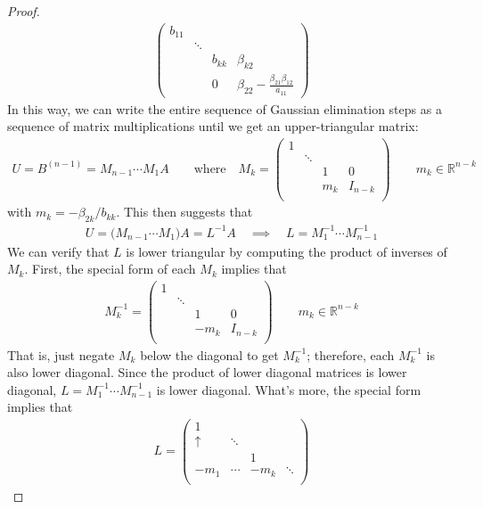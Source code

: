 \documentclass[12pt]{article}
\numberwithin{equation}{section} %
\theoremstyle{plain}
\theoremstyle{definition}
\theoremstyle{remark}
\newcommand{\R}{\mathbb{R}}
\begin{document}
\begin{proof}
\begin{align*}
\begin{pmatrix}
    b_{11} & \\
    & \ddots &  & \\
    & & b_{kk} & \beta_{k2}  \\
    & & 0 & \beta_{22}
      - \frac{\beta_{21}\beta_{12}}{a_{11}}
  \end{pmatrix}
\end{align*}
In this way, we can write the entire sequence of Gaussian elimination
steps as a sequence of matrix multiplications until we get an
upper-triangular matrix:
\begin{align*}
  U = B^{(n-1)} = M_{n-1}\cdots M_1 A
  \qquad
  \text{where}\quad
  M_k
  =
  \begin{pmatrix}
    1 & &\\
    & \ddots &\\
    & & 1 & 0\\
    & & m_k & I_{n-k} \\
  \end{pmatrix}
  \qquad m_k \in\R^{n-k}
\end{align*}
with $m_k = -\beta_{2k}/b_{kk}$.
This then suggests that
\begin{align*}
  U = \big(M_{n-1}\cdots M_1\big)A
  = L^{-1} A
  \quad\implies\quad
  L = M_1^{-1}\cdots M_{n-1}^{-1}
\end{align*}
We can verify that $L$ is lower triangular by computing the product of
inverses of $M_k$. First, the special form of each $M_k$ implies that
\begin{align*}
  M_k^{-1} =
  \begin{pmatrix}
    1 & &\\
    & \ddots &\\
    & & 1 & 0\\
    & & -m_k &I_{n-k} \\
  \end{pmatrix}
  \qquad m_k \in\R^{n-k}
\end{align*}
That is, just negate $M_k$ below the diagonal to get $M_{k}^{-1}$;
therefore, each $M_k^{-1}$ is also lower diagonal. Since the product of
lower diagonal matrices is lower diagonal,
$L=M_1^{-1}\cdots M_{n-1}^{-1}$ is lower diagonal. What's more, the
special form implies that
\begin{align*}
  L=
  \begin{pmatrix}
    1 & &\\
    \uparrow& \ddots &\\
     & & 1 \\
    -m_1 & \cdots & -m_k &\ddots \\

\end{pmatrix}
\end{align*}
\end{proof}
\end{document}
